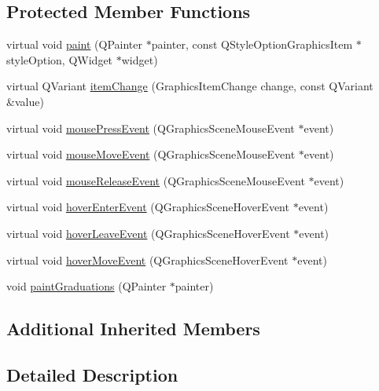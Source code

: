 \subsection*{Protected Member Functions}
\begin{DoxyCompactItemize}
\item 
virtual void \hyperlink{class_u_b_graphics_ruler_a8af93307b236910d47c28e5f3af04834}{paint} (Q\-Painter $\ast$painter, const Q\-Style\-Option\-Graphics\-Item $\ast$style\-Option, Q\-Widget $\ast$widget)
\item 
virtual Q\-Variant \hyperlink{class_u_b_graphics_ruler_a6370354dd544d18b0d0b8480a48dab14}{item\-Change} (Graphics\-Item\-Change change, const Q\-Variant \&value)
\item 
virtual void \hyperlink{class_u_b_graphics_ruler_aa224b5115229d838d45bd2148210a14c}{mouse\-Press\-Event} (Q\-Graphics\-Scene\-Mouse\-Event $\ast$event)
\item 
virtual void \hyperlink{class_u_b_graphics_ruler_a41601c1c543b49cd7d746c56b481e8ad}{mouse\-Move\-Event} (Q\-Graphics\-Scene\-Mouse\-Event $\ast$event)
\item 
virtual void \hyperlink{class_u_b_graphics_ruler_a2aa0a697c6f155c22b5487a440b31700}{mouse\-Release\-Event} (Q\-Graphics\-Scene\-Mouse\-Event $\ast$event)
\item 
virtual void \hyperlink{class_u_b_graphics_ruler_ab92e30dce1a9c167ff52545610fb6edf}{hover\-Enter\-Event} (Q\-Graphics\-Scene\-Hover\-Event $\ast$event)
\item 
virtual void \hyperlink{class_u_b_graphics_ruler_a6695d8fa85f02aa297b6d710ce0ec3df}{hover\-Leave\-Event} (Q\-Graphics\-Scene\-Hover\-Event $\ast$event)
\item 
virtual void \hyperlink{class_u_b_graphics_ruler_ae820116cd0b0d1582b95159dd778b76c}{hover\-Move\-Event} (Q\-Graphics\-Scene\-Hover\-Event $\ast$event)
\item 
void \hyperlink{class_u_b_graphics_ruler_a36aa663c026b7ceac1c2b7c3f643ac76}{paint\-Graduations} (Q\-Painter $\ast$painter)
\end{DoxyCompactItemize}
\subsection*{Additional Inherited Members}


\subsection{Detailed Description}


